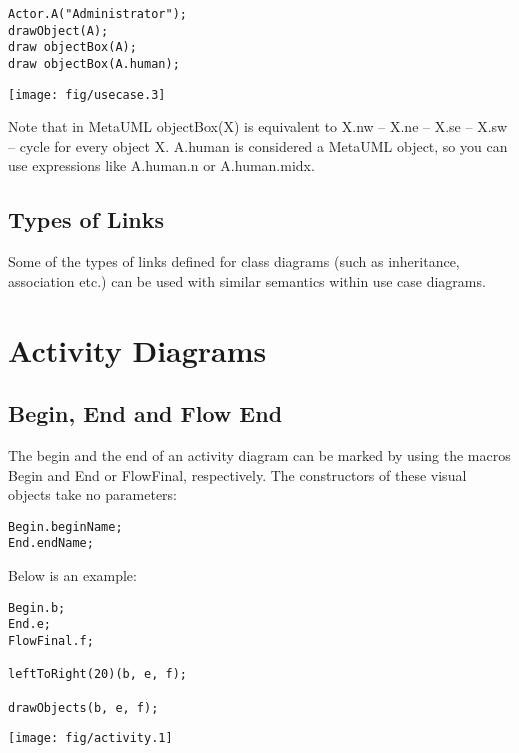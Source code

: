 \documentclass{article}
\newcommand{\code}{\ttfamily}
\begin{document}
\begin{multicols}{2}
\begin{verbatim}
Actor.A("Administrator");
drawObject(A);
draw objectBox(A);
draw objectBox(A.human);
\end{verbatim}
\columnbreak
\hspace{1cm}\texttt{[image: fig/usecase.3]}
\end{multicols}

Note that in MetaUML {\code objectBox(X)} is equivalent to {\code X.nw -- X.ne -- X.se -- X.sw -- cycle} for every object {\code X}. {\code A.human} is considered a MetaUML object, so you can use expressions like {\code A.human.n} or {\code A.human.midx}.

\subsection{Types of Links}

Some of the types of links defined for class diagrams (such as inheritance, association etc.) can be used with similar semantics within use case diagrams.

\section{Activity Diagrams}

\subsection{Begin, End and Flow End}

The begin and the end of an activity diagram can be marked by using the macros {\code Begin}
and {\code End} or {\code FlowFinal}, respectively. The constructors of these visual objects take no parameters:

\begin{verbatim}
Begin.beginName;
End.endName;
\end{verbatim}

Below is an example:

\begin{multicols}{2}
\begin{verbatim}
Begin.b;
End.e;
FlowFinal.f;

leftToRight(20)(b, e, f);

drawObjects(b, e, f);
\end{verbatim}
\columnbreak
\hspace{1cm}\texttt{[image: fig/activity.1]}
\end{multicols}
\end{document}
